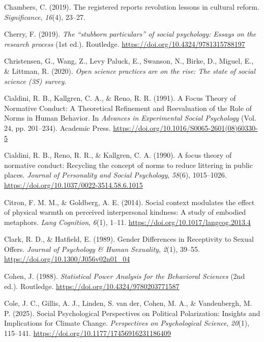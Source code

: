 \documentclass[
  letterpaper,
]{book}
\newlength{\cslhangindent}
\newenvironment{CSLReferences}[2] %
 {\begin{list}{}{%
  \setlength{\itemindent}{0pt}
  \setlength{\leftmargin}{0pt}
  \setlength{\parsep}{0pt}
  \ifodd #1
   \setlength{\leftmargin}{\cslhangindent}
   \setlength{\itemindent}{-1\cslhangindent}
  \fi
  \setlength{\itemsep}{#2\baselineskip}}}
 {\end{list}}
\begin{document}
\begin{CSLReferences}{1}{0}
Chambers, C. (2019). The registered reports revolution lessons in
cultural reform. \emph{Significance}, \emph{16}(4), 23--27.

Cherry, F. (2019). \emph{The {``stubborn particulars''} of social
psychology: {Essays} on the research process} (1st ed.). Routledge.
\url{https://doi.org/10.4324/9781315788197}

Christensen, G., Wang, Z., Levy Paluck, E., Swanson, N., Birke, D.,
Miguel, E., \& Littman, R. (2020). \emph{Open science practices are on
the rise: The state of social science (3S) survey}.

Cialdini, R. B., Kallgren, C. A., \& Reno, R. R. (1991). A {Focus}
{Theory} of {Normative} {Conduct}: {A} {Theoretical} {Refinement} and
{Reevaluation} of the {Role} of {Norms} in {Human} {Behavior}. In
\emph{Advances in {Experimental} {Social} {Psychology}} (Vol. 24, pp.
201--234). Academic Press.
\url{https://doi.org/10.1016/S0065-2601(08)60330-5}

Cialdini, R. B., Reno, R. R., \& Kallgren, C. A. (1990). A focus theory
of normative conduct: {Recycling} the concept of norms to reduce
littering in public places. \emph{Journal of Personality and Social
Psychology}, \emph{58}(6), 1015--1026.
\url{https://doi.org/10.1037/0022-3514.58.6.1015}

Citron, F. M. M., \& Goldberg, A. E. (2014). Social context modulates
the effect of physical warmth on perceived interpersonal kindness: A
study of embodied metaphors. \emph{Lang Cognition}, \emph{6}(1), 1--11.
\url{https://doi.org/10.1017/langcog.2013.4}

Clark, R. D., \& Hatfield, E. (1989). Gender {Differences} in
{Receptivity} to {Sexual} {Offers}. \emph{Journal of Psychology \& Human
Sexuality}, \emph{2}(1), 39--55.
\url{https://doi.org/10.1300/J056v02n01_04}

Cohen, J. (1988). \emph{Statistical {Power} {Analysis} for the
{Behavioral} {Sciences}} (2nd ed.). Routledge.
\url{https://doi.org/10.4324/9780203771587}

Cole, J. C., Gillis, A. J., Linden, S. van der, Cohen, M. A., \&
Vandenbergh, M. P. (2025). Social {Psychological} {Perspectives} on
{Political} {Polarization}: {Insights} and {Implications} for {Climate}
{Change}. \emph{Perspectives on Psychological Science}, \emph{20}(1),
115--141. \url{https://doi.org/10.1177/17456916231186409}


\end{CSLReferences}
\end{document}
